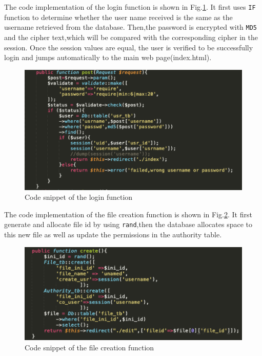 \noindent The code implementation of the login function is shown in Fig.\ref{png2}. It first uses \texttt{IF} function to determine whether the user name received is the same as the username retrieved from the database. Then,the password is encrypted with \texttt{MD5} and the cipher text,which will be compared with the corresponding cipher in the session. Once the session values are equal, the user is verified to be successfully login and jumps automatically to the main web page(index.html).
\begin{figure}[H]
  \centering
  \includegraphics[width=.8\textwidth]{login.png} %
  \caption{Code snippet of the login function} %
  \label{png2} %
\end{figure}

\noindent The code implementation of the file creation function is shown in Fig.\ref{png3}. It first generate and allocate file id by using \texttt{rand},then the database allocates space to this new file as well as update the permissions in the authority table.
\begin{figure}[H]
  \centering 
  \includegraphics[width=.8\textwidth]{createfile.png} %
  \caption{Code snippet of the file creation function} %
  \label{png3} %
\end{figure}



